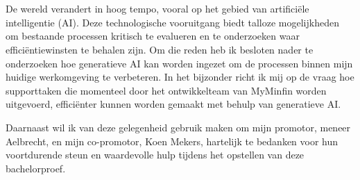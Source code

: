 
\chapter*{}
\label{ch:voorwoord}


De wereld verandert in hoog tempo, vooral op het gebied van artificiële intelligentie (AI). Deze technologische vooruitgang biedt talloze mogelijkheden om bestaande processen kritisch te evalueren en te onderzoeken waar efficiëntiewinsten te behalen zijn. Om die reden heb ik besloten nader te onderzoeken hoe generatieve AI kan worden ingezet om de processen binnen mijn huidige werkomgeving te verbeteren. In het bijzonder richt ik mij op de vraag hoe supporttaken die momenteel door het ontwikkelteam van MyMinfin worden uitgevoerd, efficiënter kunnen worden gemaakt met behulp van generatieve AI.


Daarnaast wil ik van deze gelegenheid gebruik maken om mijn promotor, meneer Aelbrecht, en mijn co-promotor, Koen Mekers, hartelijk te bedanken voor hun voortdurende steun en waardevolle hulp tijdens het opstellen van deze bachelorproef.